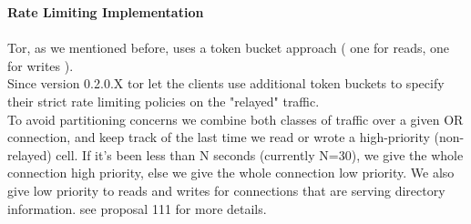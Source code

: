 \textbf{Rate Limiting Implementation}\\
\\
Tor, as we mentioned before, uses a token bucket approach ( one for reads, one for writes ).\\
Since version 0.2.0.X tor let the clients use additional token buckets to specify their strict rate limiting policies on the "relayed" traffic.\\
To avoid partitioning concerns we combine both classes of traffic over a given OR connection, and keep track of the last time we read or wrote a high-priority (non-relayed) cell. If it's been less than N seconds (currently N=30), we give the whole connection high priority, else we give the whole connection low priority. We also give low priority to reads and writes for connections that are serving directory information. see proposal 111 for more details.\\
\\




